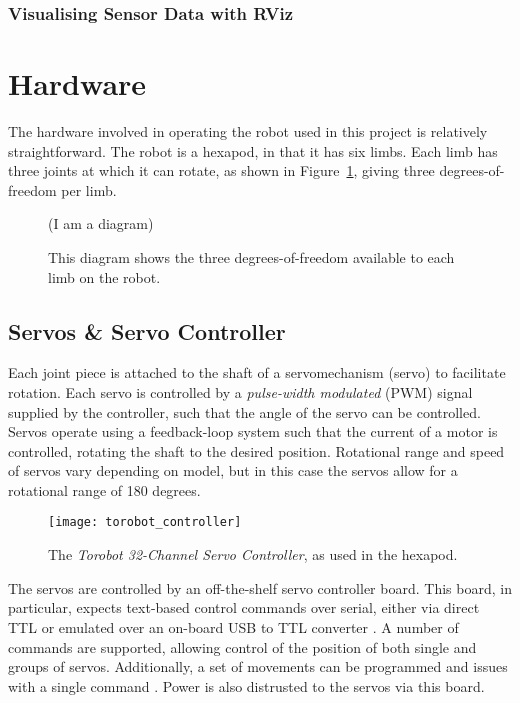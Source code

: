 \subsubsection{Visualising Sensor Data with RViz}


\section{Hardware}

The hardware involved in operating the robot used in this project is relatively straightforward. The robot is a hexapod, in that it has six limbs. Each limb has three joints at which it can rotate, as shown in Figure~\ref{fig:hexapod_dof}, giving three degrees-of-freedom per limb. 

\begin{figure}[!h]
    \centering
    (I am a diagram)
    \caption{This diagram shows the three degrees-of-freedom available to each limb on the robot.}
    \label{fig:hexapod_dof}
\end{figure}

\subsection{Servos \& Servo Controller}
Each joint piece is attached to the shaft of a servomechanism (servo) to facilitate rotation. Each servo is controlled by a \emph{pulse-width modulated} (PWM) signal supplied by the controller, such that the angle of the servo can be controlled. Servos operate using a feedback-loop system such that the current of a motor is controlled, rotating the shaft to the desired position. Rotational range and speed of servos vary depending on model, but in this case the servos allow for a rotational range of 180 degrees.

\begin{figure}[!h]
    \centering
    \texttt{[image: torobot\_controller]}
    \caption{The \emph{Torobot 32-Channel Servo Controller}, as used in the hexapod.}
    \label{fig:torobot_controller}
\end{figure}

The servos are controlled by an off-the-shelf servo controller board. This board, in particular, expects text-based control commands over serial, either via direct TTL or emulated over an on-board USB to TTL converter \cite{torobot_manual}. A number of commands are supported, allowing control of the position of both single and groups of servos. Additionally, a set of movements can be programmed and issues with a single command \cite{torobot_manual}. Power is also distrusted to the servos via this board.

